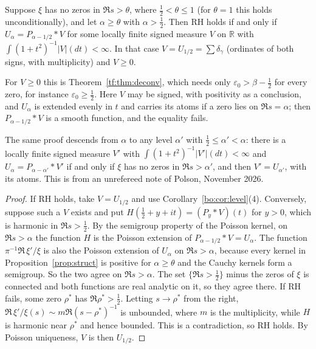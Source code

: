\begin{proposition}\label{bo:prop:descent}
Suppose $\xi$ has no zeros in $\Re s>\theta$, where $\frac12<\theta\le1$ (for $\theta=1$ this holds unconditionally), and let $\alpha\ge\theta$ with $\alpha>\frac12$. Then RH holds if and only if $U_\alpha=P_{\alpha-1/2}*V$ for some locally finite signed measure $V$ on $\mathbb R$ with $\int(1+t^2)^{-1}|V|(dt)<\infty$. In that case $V=U_{1/2}=\sum\delta_\gamma$ (ordinates of both signs, with multiplicity) and $V\ge0$.
\end{proposition}

For $V\ge0$ this is Theorem~\ref{tf:thm:deconv}, which needs only $\varepsilon_0>\beta-\frac12$ for every zero, for instance $\varepsilon_0\ge\frac12$. Here $V$ may be signed, with positivity as a conclusion, and $U_\alpha$ is extended evenly in $t$ and carries its atoms if a zero lies on $\Re s=\alpha$; then $P_{\alpha-1/2}*V$ is a smooth function, and the equality fails.

The same proof descends from $\alpha$ to any level $\alpha'$ with $\frac12\le\alpha'<\alpha$: there is a locally finite signed measure $V'$ with $\int(1+t^2)^{-1}|V'|(dt)<\infty$ and $U_\alpha=P_{\alpha-\alpha'}*V'$ if and only if $\xi$ has no zeros in $\Re s>\alpha'$, and then $V'=U_{\alpha'}$, with its atoms. This is from an unrefereed note of Polson, November 2026.

\begin{proof}
If RH holds, take $V=U_{1/2}$ and use Corollary~\ref{bo:cor:level}(4). Conversely, suppose such a $V$ exists and put $H(\frac12+y+it)=(P_y*V)(t)$ for $y>0$, which is harmonic in $\Re s>\frac12$. By the semigroup property of the Poisson kernel, on $\Re s>\alpha$ the function $H$ is the Poisson extension of $P_{\alpha-1/2}*V=U_\alpha$. The function $\pi^{-1}\Re\,\xi'/\xi$ is also the Poisson extension of $U_\alpha$ on $\Re s>\alpha$, because every kernel in Proposition~\ref{prop:struct} is positive for $\alpha\ge\theta$ and the Cauchy kernels form a semigroup. So the two agree on $\Re s>\alpha$. The set $\{\Re s>\frac12\}$ minus the zeros of $\xi$ is connected and both functions are real analytic on it, so they agree there. If RH fails, some zero $\rho^*$ has $\Re\rho^*>\frac12$. Letting $s\to\rho^*$ from the right, $\Re\,\xi'/\xi(s)\sim m\Re(s-\rho^*)^{-1}$ is unbounded, where $m$ is the multiplicity, while $H$ is harmonic near $\rho^*$ and hence bounded. This is a contradiction, so RH holds. By Poisson uniqueness, $V$ is then $U_{1/2}$.
\end{proof}


